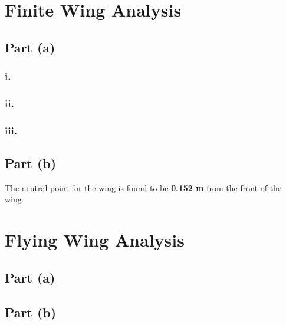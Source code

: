 \begin{singlespace}
\section{Finite Wing Analysis}
\subsection{Part (a)}
\subsubsection{i.}
\subsubsection{ii.}

\subsubsection{iii.}
\subsection{Part (b)}
The neutral point for the wing is found to be \textbf{0.152 m} from the front of the wing.

\section{Flying Wing Analysis}
\subsection{Part (a)}
\subsection{Part (b)}
\end{singlespace}
